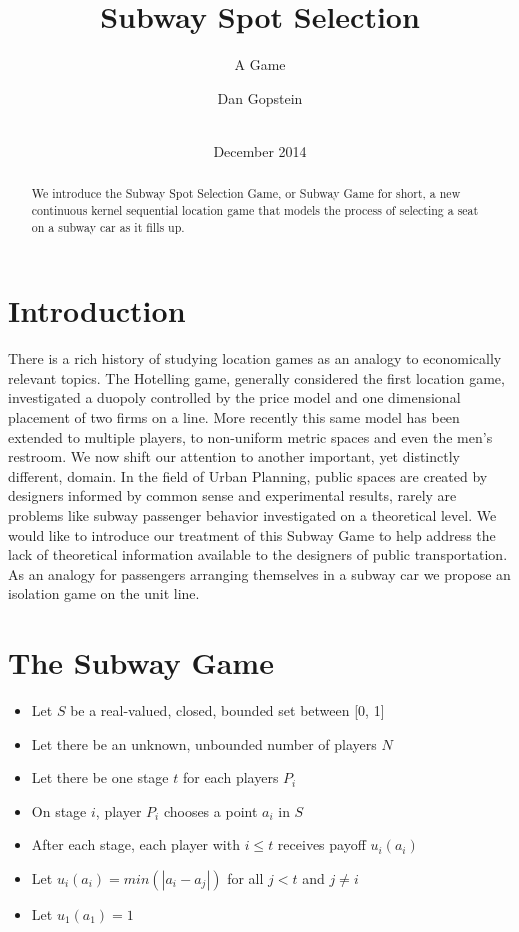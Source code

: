 \documentclass{acm_proc_article-sp}
\begin{document}
\title{Subway Spot Selection}
\subtitle{A Game}

\author{
\alignauthor
       Dan Gopstein\\
       \\
}

\date{December 2014}

\maketitle
\begin{abstract}
We introduce the Subway Spot Selection Game, or Subway Game for short, a new continuous kernel sequential location game that models the process of selecting a seat on a subway car as it fills up.
\end{abstract}

\section{Introduction}
There is a rich history of studying location games as an analogy to economically relevant topics. The Hotelling game\cite{hotelling1990stability}, generally considered the first location game, investigated a duopoly controlled by the price model and one dimensional placement of two firms on a line. More recently this same model has been extended to multiple players\cite{economides1993hotelling}, to non-uniform metric spaces\cite{zhao2008isolation} and even the men's restroom\cite{heufer2011washroom, kranakis2010urinal}.
\indent We now shift our attention to another important, yet distinctly different, domain. In the field of Urban Planning, public spaces are created by designers informed by common sense and experimental results, rarely are problems like subway passenger behavior investigated on a theoretical level. We would like to introduce our treatment of this Subway Game to help address the lack of theoretical information available to the designers of public transportation. As an analogy for passengers arranging themselves in a subway car we propose an isolation game on the unit line.

\section{The Subway Game}
\begin{itemize}
\item Let $S$ be a real-valued, closed, bounded set between [0, 1]
\item Let there be an unknown, unbounded number of players $N$
\item Let there be one stage $t$ for each players $P_i$
\item On stage $i$, player $P_i$ chooses a point $a_i$ in $S$
\item After each stage, each player with $i \leq t$ receives payoff $u_i(a_i)$
\item Let $u_i(a_i)=min(|a_i - a_j|)$ for all $j <  t$ and $j \neq i$
\item Let $u_1(a_1)=1$
\end{itemize}
\end{document}

